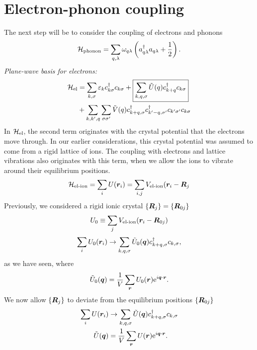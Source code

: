 \section{Electron-phonon coupling}

The next step will be to consider the coupling of electrons and phonons
\begin{equation}
	\mathcal{H}_{\text{phonon}} = \sum_{q, \lambda}\omega_{q\lambda}\left (a_{q\lambda}^{\dagger}a_{q\lambda} + \frac{1}{2}\right ).
\end{equation}
\emph{Plane-wave basis for electrons:}
\begin{align}
	\mathcal{H}_{\text{el}} &= \sum_{k,\sigma}\varepsilon_kc^{\dagger}_{k\sigma}c_{k\sigma} + \boxed{\sum_{k,q,\sigma}\tilde{U}(q)c^{\dagger}_{k+q}c_{k\sigma}} \nonumber\\
	&+\sum_{k,k',q}\sum_{\sigma\sigma'}\tilde{V}(q)c^{\dagger}_{k+q,\sigma}c^{\dagger}_{k'-q,\sigma'}c_{k'\sigma'}c_{k\sigma}
\end{align}
In $\mathcal{H}_{\text{el}}$, the second term originates with the crystal potential that the electrons move through. In our earlier considerations, this crystal potential was assumed to come from a rigid lattice of ions. The coupling with electrons and lattice vibrations also originates with this term, when we allow the ions to vibrate around their equilibrium positions. 
\begin{equation}
	\mathcal{H}_{\text{el-ion}} = \sum_{i}U(\bm{r}_{i}) = \sum_{i,j}V_{\text{el-ion}}(\bm{r}_{i}-\bm{R}_{j}
\end{equation}
Previously, we considered a rigid ionic crystal $\{\bm{R}_j\} = \{\bm{R}_{0j}\}$
\begin{equation}
	U_0 \equiv \sum_{j}V_{\text{el-ion}}(\bm{r}_{i} - \bm{R}_{0j}) \\
\end{equation}
\begin{equation}
	\sum_{i}U_{0}(\bm{r}_{i}) \rightarrow \sum_{k,q,\sigma}\tilde{U}_{0}(\bm{q})c^{\dagger}_{k+q,\sigma}c_{k,\sigma},
\end{equation}
as we have seen, where
\begin{equation}
	\tilde{U}_{0}(\bm{q}) = \frac{1}{V}\sum_{\bm{r}}U_{0}(\bm{r})\mathrm{e}^{i\bm{q}\cdot\bm{r}}.
\end{equation}
We now allow $\{\bm{R}_{j}\}$ to deviate from the equilibrium positions $\{\bm{R}_{0j}\}$
\begin{align}
	\sum_{i}U(\bm{r}_{i}) &\rightarrow \sum_{k,q,\sigma}\tilde{U}(\bm{q})c^{\dagger}_{k+q, \sigma}c_{k,\sigma}\\
		\tilde{U}(\bm{q}) &= \frac{1}{V}\sum_{\bm{r}}U(\bm{r})\mathrm{e}^{i\bm{q}\cdot\bm{r}}.
\end{align}
